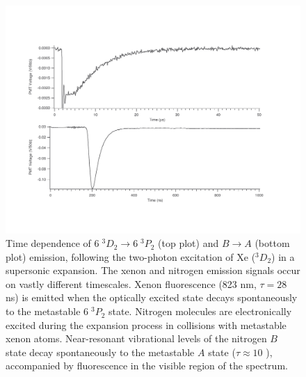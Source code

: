 \documentclass[12pt]{mitthesis}
\begin{document}
\begin{figure}
  \caption{Time dependence of  $6\;^3D_2 \rightarrow 6\;^3P_2$
    (top plot) and  $B \rightarrow A$ (bottom plot) emission,
    following the two-photon excitation of Xe ($^3D_2$) in a
    supersonic expansion.  The xenon and nitrogen emission signals
    occur on vastly different timescales.  Xenon fluorescence (823 nm,
    $\tau=28$ ns) is emitted when the optically excited state decays
    spontaneously to the metastable $6\;^3P_2$ state.  Nitrogen
    molecules are electronically excited during the expansion process
    in collisions with metastable xenon atoms.  Near-resonant
    vibrational levels of the nitrogen $B$ state decay spontaneously
    to the metastable $A$ state ($\tau \approx 10$ \microsec),
    accompanied by fluorescence in the visible region of the
    spectrum. }
  \label{fig:xen2-traces}
  \centering
  \includegraphics[width=7.7in,angle=90,trim=0 0 1in 1cm ]{XeN2-traces.pdf}
\end{figure}





\end{document}
